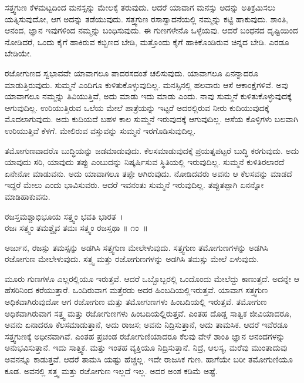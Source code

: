 ಸತ್ತ್ವಗುಣ ಕೆಳಮಟ್ಟದಿಂದ ಮನಸ್ಸನ್ನು ಮೇಲಕ್ಕೆ ತರುವುದು. ಆದರೆ ಯಾವಾಗ ಮನಸ್ಸು ಅದನ್ನು ಅತಿಕ್ರಮಿಸಲು ಯತ್ನಿಸುವುದೋ, ಆಗ ಅದನ್ನು ತಡೆಯುವುದು. ಸತ್ತ್ವಗುಣ ರಸಾಸ್ವಾದನೆಯಲ್ಲಿ ನಮ್ಮನ್ನು ಕಟ್ಟಿ ಹಾಕುವುದು. ಶಾಂತಿ, ಆನಂದ, ಜ್ಞಾನ ಇವುಗಳಿಂದ ನಮ್ಮನ್ನು ಬಂಧಿಸುವುದು. ಈ ಗುಣಗಳೇನೊ ಒಳ್ಳೆಯವು. ಆದರೆ ಬಂಧನದ ದೃಷ್ಟಿಯಿಂದ ನೋಡಿದರೆ, ಒಂದು ಕೈಗೆ ಹಾಕಿರುವ ಕಬ್ಬಿಣದ ಬೇಡಿ, ಮತ್ತೊಂದು ಕೈಗೆ ಹಾಕಿಕೊಂಡಿರುವ ಚಿನ್ನದ ಬೇಡಿ. ಎರಡೂ ಬೇಡಿಯೇ.

ರಜೋಗುಣದ ಸ್ವಭಾವವೇ ಯಾವಾಗಲೂ ಪಾದರಸದಂತೆ ಚಲಿಸುವುದು. ಯಾವಾಗಲೂ ಏನನ್ನಾದರೂ ಮಾಡುತ್ತಿರುವುದು. ಸುಮ್ಮನೆ ಎಂದಿಗೂ ಕುಳಿತುಕೊಳ್ಳುವುದಿಲ್ಲ. ಮನಸ್ಸಿನಲ್ಲಿ ಹಲವಾರು ಆಸೆ ಆಕಾಂಕ್ಷೆಗಳಿವೆ. ಅವು ಯಾವಾಗಲೂ ನಮ್ಮನ್ನು ತಿವಿಯುತ್ತಿವೆ, ಅದು ಮಾಡು ಇದು ಮಾಡು ಎಂದು. ನಾವು ಸುಮ್ಮನೆ ಕುಳಿತುಕೊಳ್ಳುವುದಕ್ಕೆ ಆಗುವುದಿಲ್ಲ. ಉರಿಯುತ್ತಿರುವ ಒಲೆಯ ಮೇಲೆ ಪಾತ್ರೆಯನ್ನು ಇಟ್ಟರೆ ಅದರಲ್ಲಿರುವ ನೀರು ಕುದಿಯುವುದಕ್ಕೆ ಮೊದಲಾಗುವುದು. ಅದು ಕುದಿಯದೆ ಬಹಳ ಕಾಲ ಸುಮ್ಮನೆ ಇರುವುದಕ್ಕೆ ಆಗುವುದಿಲ್ಲ. ಆಸೆಯ ಕೊಳ್ಳಿಗಳು ಬಲವಾಗಿ ಉರಿಯುತ್ತಿವೆ ಕೆಳಗೆ. ಮೇಲಿರುವ ವಸ್ತುವನ್ನು ಸುಮ್ಮನೆ ಇರಗೊಡಿಸುವುದಿಲ್ಲ.

ತಮೋಗುಣವಾದರೊ ಬುದ್ಧಿಯನ್ನು ಜಡಮಾಡುವುದು. ಕೆಲಸಮಾಡುವುದಕ್ಕೆ ಪ್ರಯತ್ನ\-ಪಟ್ಟರೆ ಬುದ್ಧಿ ಕರಗುವುದು. ಅದು ಯಾವುದು ಸರಿ, ಯಾವುದು ತಪ್ಪು ಎಂಬುದನ್ನು ನಿಷ್ಕರ್ಷಿಸುವ ಸ್ಥಿತಿಯಲ್ಲಿ ಇರುವುದಿಲ್ಲ. ಸುಮ್ಮನೆ ಕುಳಿತಿರಲಾರದೆ ಏನೇನೋ ಮಾಡುವನು. ಅದು ಯಾವಾ\-ಗಲೂ ತಪ್ಪೇ ಆಗಿರುವುದು. ನೋಡಿದವರು ಅವನು ಆ ಕೆಲಸವನ್ನು ಮಾಡದೆ ಇದ್ದರೆ ಮೇಲು ಎಂದು ಭಾವಿಸುವರು. ಆದರೆ ಇವನಂತು ಸುಮ್ಮನೆ ಇರುವುದಿಲ್ಲ. ತಪ್ಪುತಪ್ಪಾಗಿ ಏನನ್ನೋ ಮಾಡಿಹಾಕುವನು.

\begin{shloka}
ರಜಸ್ತಮಶ್ಚಾಭಿಭೂಯ ಸತ್ತ್ವಂ ಭವತಿ ಭಾರತ~।\\ರಜಃ ಸತ್ತ್ವಂ ತಮಶ್ಚೈವ ತಮಃ ಸತ್ತ್ವಂ ರಜಸ್ತಥಾ \hfill॥ ೧ಂ~॥
\end{shloka}

\begin{artha}
ಅರ್ಜುನ, ರಜಸ್ಸು ತಮಸ್ಸನ್ನು ಅಡಗಿಸಿ ಸತ್ತ್ವಗುಣ ಮೇಲೇಳುವುದು. ಸತ್ತ್ವಗುಣ ತಮೋಗುಣಗಳನ್ನು ಅಡಗಿಸಿ ರಜೋಗುಣ ಮೇಲೇಳುವುದು. ಸತ್ತ್ವ ಮತ್ತು ರಜೋಗುಣಗಳನ್ನು ಅಡಗಿಸಿ ತಮಸ್ಸು ಮೇಲೆ ಏಳುವುದು.
\end{artha}

ಮೂರು ಗುಣಗಳೂ ಎಲ್ಲರಲ್ಲಿಯೂ ಇರುತ್ತವೆ. ಆದರೆ ಒಬ್ಬೊಬ್ಬರಲ್ಲಿ ಒಂದೊಂದು ಮೇಲೆದ್ದು ಕಾಣುತ್ತದೆ. ಅದನ್ನೇ ಆ ಹೆಸರಿನಿಂದ ಕರೆಯುತ್ತಾರೆ. ಒಂದಿರುವಾಗ ಮತ್ತೆರಡು ಅದರ ಹಿಂಬದಿಯಲ್ಲಿಇರುತ್ತವೆ. ಯಾವಾಗ ಸತ್ತ್ವಗುಣ ಅಧಿಕವಾಗಿರುವುದೋ ಆಗ ರಜೋಗುಣ ಮತ್ತು ತಮೋಗುಣಗಳು ಹಿಂಬದಿಯಲ್ಲಿ ಇರುತ್ತವೆ. ತಮೋಗುಣ ಅಧಿಕವಾಗಿರುವಾಗ ಸತ್ತ್ವ ಮತ್ತು ರಜೋಗುಣಗಳು ಹಿಂಬದಿಯಲ್ಲಿರುತ್ತವೆ. ಎಂತಹ ದೊಡ್ಡ ಸಾತ್ವಿಕ ಜೀವಿಯಾದರೂ, ಅವನು ಏನಾದರೂ ಕೆಲಸಮಾಡುತ್ತಾನೆ, ಅದು ರಾಜಸ; ಅವನು ನಿದ್ರಿಸುತ್ತಾನೆ, ಅದು ತಾಮಸಿಕ. ಆದರೆ ಇವೆರಡೂ ಸತ್ತ್ವಗುಣಕ್ಕೆ ಅಧೀನವಾಗಿವೆ. ಎಂತಹ ಪ್ರಚಂಡ ರಜೋಗುಣಿಯಾದರೂ ಕೆಲವು ವೇಳೆ ಶಾಂತಿ ಜ್ಞಾನ ಆನಂದಗಳನ್ನು ಅನುಭವಿಸುತ್ತಾನೆ. ಇದು ಸಾತ್ತ್ವಿಕ. ಮತ್ತು ಇಂತಹ ವ್ಯಕ್ತಿಯೂ ನಿದ್ರಿಸುತ್ತಾನೆ. ನಿದ್ರೆ, ಆಲಸ್ಯ, ಮರೆವು ಮುಂತಾದುವು ಅವನನ್ನೂ ಕಾಡುತ್ತವೆ. ಆದರೆ ತಾಮಸಿ ಯಷ್ಟು ಹೆಚ್ಚಲ್ಲ. ಇದೇ ರಾಜಸಿಕ ಗುಣ. ಹಾಗೆಯೇ ಬರೀ ತಮೋಗುಣಿಯೂ ಕೂಡ. ಅವನಲ್ಲಿ ಸತ್ತ್ವ ಮತ್ತು ರಜೋಗುಣ ಇಲ್ಲದೆ ಇಲ್ಲ. ಅದರ ಅಂಶ ಕಡಿಮೆ ಅಷ್ಟೆ.

